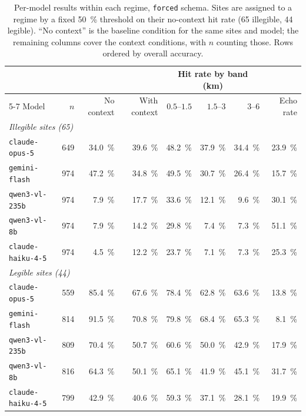 \documentclass[10pt,a4paper]{article}
\begin{document}
\begin{table}[!htbp]
\centering
\caption{Per-model results within each regime, \texttt{forced} schema. Sites are
assigned to a regime by a fixed \SI{50}{\percent} threshold on their no-context
hit rate (\num{65} illegible, \num{44} legible). ``No context'' is the
baseline condition for the same sites and model; the remaining columns cover the
context conditions, with $n$ counting those. Rows ordered by overall accuracy.}
\label{tab:regimemodel}
\small
\begin{tabular}{lrrrrrrr}
\toprule
& & & & \multicolumn{3}{c}{Hit rate by band (\si{\kilo\metre})} & \\
\cmidrule(lr){5-7}
Model & $n$ & No context & With context & $0.5$--$1.5$ & $1.5$--$3$ & $3$--$6$ & Echo rate \\
\midrule
\multicolumn{8}{l}{\emph{Illegible sites (\num{65})}} \\
\texttt{claude-opus-5} & 649 & \SI{34.0}{\percent} & \SI{39.6}{\percent} & \SI{48.2}{\percent} & \SI{37.9}{\percent} & \SI{34.4}{\percent} & \SI{23.9}{\percent} \\
\texttt{gemini-flash} & 974 & \SI{47.2}{\percent} & \SI{34.8}{\percent} & \SI{49.5}{\percent} & \SI{30.7}{\percent} & \SI{26.4}{\percent} & \SI{15.7}{\percent} \\
\texttt{qwen3-vl-235b} & 974 & \SI{7.9}{\percent} & \SI{17.7}{\percent} & \SI{33.6}{\percent} & \SI{12.1}{\percent} & \SI{9.6}{\percent} & \SI{30.1}{\percent} \\
\texttt{qwen3-vl-8b} & 974 & \SI{7.9}{\percent} & \SI{14.2}{\percent} & \SI{29.8}{\percent} & \SI{7.4}{\percent} & \SI{7.3}{\percent} & \SI{51.1}{\percent} \\
\texttt{claude-haiku-4-5} & 974 & \SI{4.5}{\percent} & \SI{12.2}{\percent} & \SI{23.7}{\percent} & \SI{7.1}{\percent} & \SI{7.3}{\percent} & \SI{25.3}{\percent} \\
\midrule
\multicolumn{8}{l}{\emph{Legible sites (\num{44})}} \\
\texttt{claude-opus-5} & 559 & \SI{85.4}{\percent} & \SI{67.6}{\percent} & \SI{78.4}{\percent} & \SI{62.8}{\percent} & \SI{63.6}{\percent} & \SI{13.8}{\percent} \\
\texttt{gemini-flash} & 814 & \SI{91.5}{\percent} & \SI{70.8}{\percent} & \SI{79.8}{\percent} & \SI{68.4}{\percent} & \SI{65.3}{\percent} & \SI{8.1}{\percent} \\
\texttt{qwen3-vl-235b} & 809 & \SI{70.4}{\percent} & \SI{50.7}{\percent} & \SI{60.6}{\percent} & \SI{50.0}{\percent} & \SI{42.9}{\percent} & \SI{17.9}{\percent} \\
\texttt{qwen3-vl-8b} & 816 & \SI{64.3}{\percent} & \SI{50.1}{\percent} & \SI{65.1}{\percent} & \SI{41.9}{\percent} & \SI{45.1}{\percent} & \SI{31.7}{\percent} \\
\texttt{claude-haiku-4-5} & 799 & \SI{42.9}{\percent} & \SI{40.6}{\percent} & \SI{59.3}{\percent} & \SI{37.1}{\percent} & \SI{28.1}{\percent} & \SI{19.9}{\percent} \\
\bottomrule
\end{tabular}
\end{table}
\end{document}
